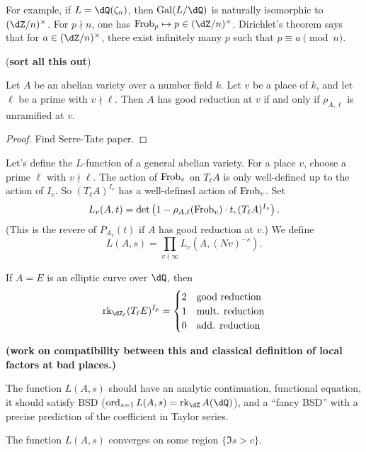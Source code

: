 For example, if $L=\dQ(\zeta_n)$, then $\gal(L/\dQ)$ is naturally isomorphic to 
$(\dZ/n)^\times$. For $p\nmid n$, one has $\frob_p \mapsto p\in (\dZ/n)^\times$. 
Dirichlet's theorem says that for $a\in (\dZ/n)^\times$, there exist infinitely 
many $p$ such that $p\equiv a\pmod n$. 

(\textbf{sort all this out})

\begin{theorem}
Let $A$ be an abelian variety over a number field $k$. Let $v$ be a place of 
$k$, and let $\ell$ be a prime with $v\nmid \ell$. Then $A$ has good reduction 
at $v$ if and only if $\rho_{A,\ell}$ is unramified at $v$. 
\end{theorem}
\begin{proof}
Find Serre-Tate paper.
\end{proof}

Let's define the $L$-function of a general abelian variety. For a place $v$, 
choose a prime $\ell$ with $v\nmid \ell$. The action of 
$\mathrm{Frob}_v$ on $T_\ell A$ is only well-defined up to the action of 
$I_v$. So $(T_\ell A)^{I_v}$ has a well-defined action of $\mathrm{Frob}_v$. Set 
\[
  L_v(A,t) = \det\left(1-\rho_{A,\ell}(\mathrm{Frob}_v)\cdot t,(T_\ell A)^{I_v}\right) \text{.}
\]
(This is the revere of $P_{A_v}(t)$ if $A$ has good reduction at $v$.) We define 
\[
  L(A,s) = \prod_{v\nmid \infty} L_v(A,(N v)^{-s}) \text{.}
\]

If $A=E$ is an elliptic curve over $\dQ$, then 
\[
  \rank_{\dZ_\ell} (T_\ell E)^{I_p}
  =
  \begin{cases}
    2 & \text{good reduction} \\
    1 & \text{mult. reduction} \\
    0 & \text{add. reduction}
  \end{cases}
\]

\textbf{(work on compatibility between this and classical definition of 
local factors at bad places.)}

The function $L(A,s)$ should have an analytic continuation, functional equation, 
it should satisfy BSD ($\ord_{s=1} L(A,s) = \rank_\dZ A(\dQ)$), and a ``fancy BSD'' 
with a precise prediction of the coefficient in Taylor series. 

The function $L(A,s)$ converges on some region $\{\Im s>c\}$. 






